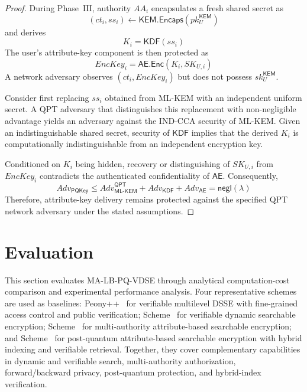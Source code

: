 \documentclass{ieeetj}
\theoremstyle{ieee-style}
\begin{document}
\begin{proof}
During Phase~III, authority $AA_i$ encapsulates a fresh shared secret as
\begin{equation}
(ct_i,ss_i)
\leftarrow
\mathsf{KEM.Encaps}(pk_U^{\mathsf{KEM}})
\end{equation}
and derives
\begin{equation}
K_i=\mathsf{KDF}(ss_i)
\end{equation}
The user's attribute-key component is then protected as
\begin{equation}
EncKey_i=
\mathsf{AE.Enc}(K_i,SK_{U,i})
\end{equation}
A network adversary observes $(ct_i,EncKey_i)$ but does not possess
$sk_U^{\mathsf{KEM}}$.

Consider first replacing $ss_i$ obtained from ML-KEM with an independent
uniform secret. A QPT adversary that distinguishes this replacement with
non-negligible advantage yields an adversary against the IND-CCA security
of ML-KEM. Given an indistinguishable shared secret, security of
$\mathsf{KDF}$ implies that the derived $K_i$ is computationally
indistinguishable from an independent encryption key.

Conditioned on $K_i$ being hidden, recovery or distinguishing of
$SK_{U,i}$ from $EncKey_i$ contradicts the authenticated confidentiality
of $\mathsf{AE}$. Consequently,
\begin{equation}
Adv_{\mathsf{PQKey}}
\le
Adv_{\mathsf{ML\mbox{-}KEM}}^{\mathsf{QPT}}
+
Adv_{\mathsf{KDF}}
+
Adv_{\mathsf{AE}}
=
\mathsf{negl}(\lambda)
\end{equation}
Therefore, attribute-key delivery remains protected against the specified
QPT network adversary under the stated assumptions.
\end{proof}




\section{Evaluation}
\label{sec:evaluation}

This section evaluates MA-LB-PQ-VDSE through analytical computation-cost
comparison and experimental performance analysis. Four representative
schemes are used as baselines: Peony++~\cite{ref30} for verifiable
multilevel DSSE with fine-grained access control and public verification;
Scheme~\cite{ref35} for verifiable dynamic searchable encryption;
Scheme~\cite{ref41} for multi-authority attribute-based searchable
encryption; and Scheme~\cite{ref54} for post-quantum attribute-based
searchable encryption with hybrid indexing and verifiable retrieval.
Together, they cover complementary capabilities in dynamic and verifiable
search, multi-authority authorization, forward/backward privacy,
post-quantum protection, and hybrid-index verification.
\end{document}
